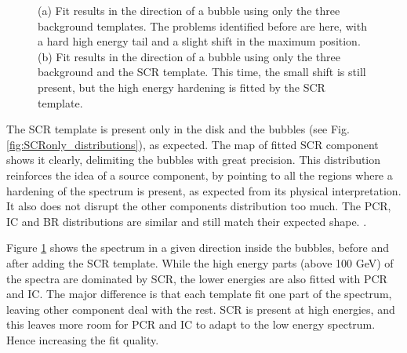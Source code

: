 \begin{figure}[h]
\begin{minipage}[h]{0.45\textwidth}
	  \subcaption{}
	  \label{fig:BKGonly_bubble_spec}
  \end{minipage}	 
  \caption{(a) Fit results in the direction of a bubble using only the three background templates. The problems identified before are here, with a hard high energy tail and a slight shift in the maximum position. (b) Fit results in the direction of a bubble using only the three background and the SCR template. This time, the small shift is still present, but the high energy hardening is fitted by the SCR template.}
	  \label{fig:SCRonly_BKGonly_spec_comp}
\end{figure}

The SCR template is present only in the disk and the bubbles (see Fig. \ref{fig:SCRonly_distributions}), as expected. The map of fitted SCR component shows it clearly, delimiting the bubbles with great precision. This distribution reinforces the idea of a source component, by pointing to all the regions where a hardening of the spectrum is present, as expected from its physical interpretation.
It also does not disrupt the other components distribution too much. The PCR, IC and BR distributions are similar and still match their expected shape. .

Figure \ref{fig:SCRonly_BKGonly_spec_comp} shows the spectrum in a given direction inside the bubbles, before and after adding the SCR template. While the high energy parts (above 100 GeV) of the spectra are dominated by SCR, the lower energies are also fitted with PCR and IC. The major difference is that each template fit one part of the spectrum, leaving other component deal with the rest. SCR is present at high energies, and this leaves more room for PCR and IC to adapt to the low energy spectrum. Hence increasing the fit quality.

